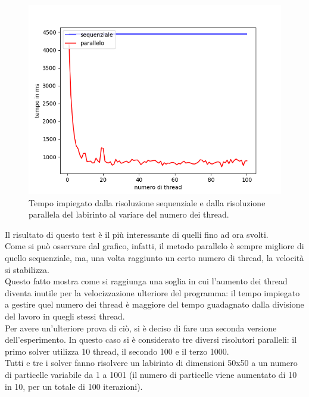 \documentclass[10pt,twocolumn,letterpaper]{article}
\begin{document}
\begin{figure}[H]
\includegraphics[width=1.1\linewidth]{test/test3}
\caption{\small Tempo impiegato dalla risoluzione sequenziale e dalla risoluzione parallela del labirinto al variare del numero dei thread.}
\label{t3}
\end{figure}

Il risultato di questo test è il più interessante di quelli fino ad ora svolti.\\
Come si può osservare dal grafico, infatti, il metodo parallelo è sempre migliore di quello sequenziale, ma, una volta raggiunto un certo numero di thread, la velocità si stabilizza.\\
Questo fatto mostra come si raggiunga una soglia in cui l'aumento dei thread diventa inutile per la velocizzazione ulteriore del programma: il tempo impiegato a gestire quel numero dei thread è maggiore del tempo guadagnato dalla divisione del lavoro in quegli stessi thread.\\
Per avere un'ulteriore prova di ciò, si è deciso di fare una seconda versione dell'esperimento. In questo caso si è considerato tre diversi risolutori paralleli: il primo solver utilizza 10 thread, il secondo 100 e il terzo 1000.\\
Tutti e tre i solver fanno risolvere un labirinto di dimensioni 50x50 a un numero di particelle variabile da 1 a 1001 (il numero di particelle viene aumentato di 10 in 10, per un totale di 100 iterazioni).\\
\end{document}
